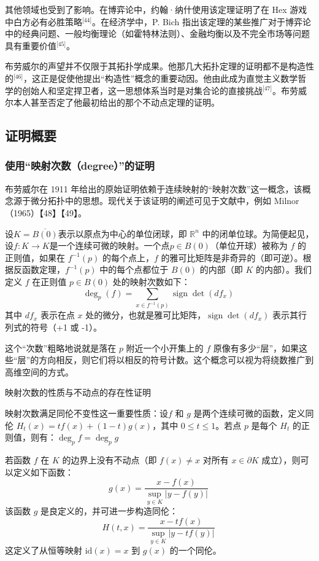 其他领域也受到了影响。在博弈论中，约翰·纳什使用该定理证明了在 Hex 游戏中白方必有必胜策略\(^\text{[44]}\)。在经济学中，P. Bich 指出该定理的某些推广对于博弈论中的经典问题、一般均衡理论（如霍特林法则）、金融均衡以及不完全市场等问题具有重要价值\(^\text{[45]}\)。

布劳威尔的声望并不仅限于其拓扑学成果。他那几大拓扑定理的证明都不是构造性的\(^\text{[46]}\)，这正是促使他提出“构造性”概念的重要动因。他由此成为直觉主义数学哲学的创始人和坚定捍卫者，这一思想体系当时是对集合论的直接挑战\(^\text{[47]}\)。布劳威尔本人甚至否定了他最初给出的那个不动点定理的证明。
\subsection{证明概要}
\subsubsection{使用“映射次数（degree）”的证明}
布劳威尔在 1911 年给出的原始证明依赖于连续映射的“映射次数”这一概念，该概念源于微分拓扑中的思想。现代关于该证明的阐述可见于文献中，例如 Milnor（1965）【48】【49】。

设$K = \overline{B(0)}$表示以原点为中心的单位闭球，即 $\mathbb{R}^n$ 中的闭单位球。为简便起见，设$f: K \to K$是一个连续可微的映射。一个点$p \in B(0)$（单位开球）被称为 $f$ 的正则值，如果在 $f^{-1}(p)$ 的每个点上，$f$ 的雅可比矩阵是非奇异的（即可逆）。根据反函数定理，$f^{-1}(p)$ 中的每个点都位于 $B(0)$ 的内部（即 $K$ 的内部）。我们定义 $f$ 在正则值 $p \in B(0)$ 处的映射次数如下：
$$
\deg_p(f) = \sum_{x \in f^{-1}(p)} \operatorname{sign} \det(df_x)~
$$
其中 $df_x$ 表示在点 $x$ 处的微分，也就是雅可比矩阵，$\operatorname{sign} \det(df_x)$ 表示其行列式的符号（+1 或 -1）。

这个“次数”粗略地说就是落在 $p$ 附近一个小开集上的 $f$ 原像有多少“层”，如果这些“层”的方向相反，则它们将以相反的符号计数。这个概念可以视为将绕数推广到高维空间的方式。

映射次数的性质与不动点的存在性证明

映射次数满足同伦不变性这一重要性质：设$f$ 和 $g$ 是两个连续可微的函数，定义同伦 $H_t(x) = t f(x) + (1 - t) g(x)$，其中 $0 \leq t \leq 1$。若点 $p$ 是每个 $H_t$ 的正则值，则有：$\deg_p f = \deg_p g$

若函数 $f$ 在 $K$ 的边界上没有不动点（即 $f(x) \neq x$ 对所有 $x \in \partial K$ 成立），则可以定义如下函数：
$$
g(x) = \frac{x - f(x)}{\sup_{y \in K} |y - f(y)|}~
$$
该函数 $g$ 是良定义的，并可进一步构造同伦：
$$
H(t, x) = \frac{x - t f(x)}{\sup_{y \in K} |y - t f(y)|}~
$$
这定义了从恒等映射 $\text{id}(x) = x$ 到 $g(x)$ 的一个同伦。

